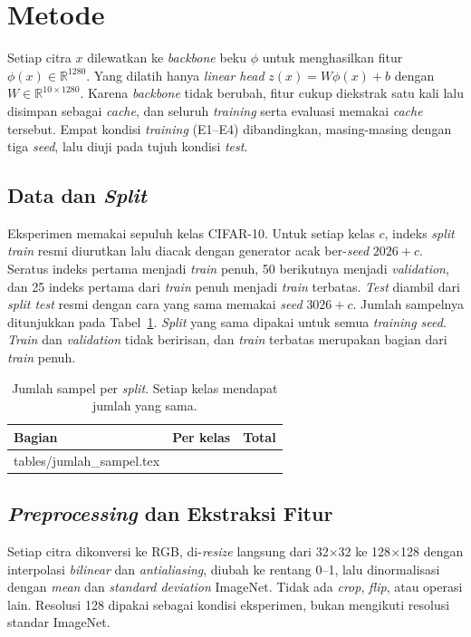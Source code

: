 \documentclass[conference]{IEEEtran}
\makeatletter
\newcommand{\tabinput}[1]{\@@input #1 }
\makeatother
\begin{document}
\section{Metode}\label{sec:method}

Setiap citra $x$ dilewatkan ke \emph{backbone} beku $\phi$ untuk menghasilkan fitur $\phi(x) \in \mathbb{R}^{1280}$. Yang dilatih hanya \emph{linear head} $z(x) = W\phi(x) + b$ dengan $W \in \mathbb{R}^{10 \times 1280}$. Karena \emph{backbone} tidak berubah, fitur cukup diekstrak satu kali lalu disimpan sebagai \emph{cache}, dan seluruh \emph{training} serta evaluasi memakai \emph{cache} tersebut. Empat kondisi \emph{training} (E1--E4) dibandingkan, masing-masing dengan tiga \emph{seed}, lalu diuji pada tujuh kondisi \emph{test}.

\subsection{Data dan \emph{Split}}

Eksperimen memakai sepuluh kelas CIFAR-10. Untuk setiap kelas $c$, indeks \emph{split train} resmi diurutkan lalu diacak dengan generator acak ber-\emph{seed} $2026 + c$. Seratus indeks pertama menjadi \emph{train} penuh, 50 berikutnya menjadi \emph{validation}, dan 25 indeks pertama dari \emph{train} penuh menjadi \emph{train} terbatas. \emph{Test} diambil dari \emph{split test} resmi dengan cara yang sama memakai \emph{seed} $3026 + c$. Jumlah sampelnya ditunjukkan pada Tabel~\ref{tab:split}. \emph{Split} yang sama dipakai untuk semua \emph{training seed}. \emph{Train} dan \emph{validation} tidak beririsan, dan \emph{train} terbatas merupakan bagian dari \emph{train} penuh.

\begin{table}[t]
\caption{Jumlah sampel per \emph{split}. Setiap kelas mendapat jumlah yang sama.}
\label{tab:split}
\centering
\begin{tabular}{lrr}
\toprule
Bagian & Per kelas & Total \\
\midrule
\tabinput{tables/jumlah_sampel.tex}
\bottomrule
\end{tabular}
\end{table}

\subsection{\emph{Preprocessing} dan Ekstraksi Fitur}

Setiap citra dikonversi ke RGB, di-\emph{resize} langsung dari 32$\times$32 ke 128$\times$128 dengan interpolasi \emph{bilinear} dan \emph{antialiasing}, diubah ke rentang 0--1, lalu dinormalisasi dengan \emph{mean} dan \emph{standard deviation} ImageNet. Tidak ada \emph{crop}, \emph{flip}, atau operasi lain. Resolusi 128 dipakai sebagai kondisi eksperimen, bukan mengikuti resolusi standar ImageNet.
\end{document}
